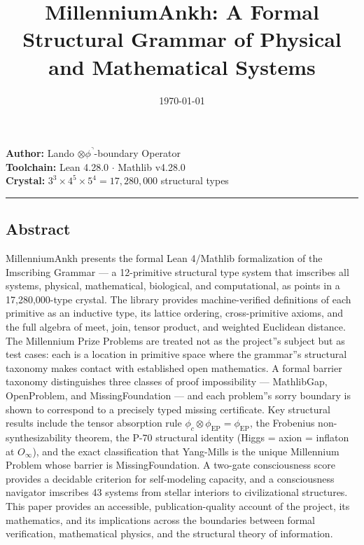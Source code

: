 \documentclass[12pt,a4paper]{article}
\begin{document}
\title{MillenniumAnkh: A Formal Structural Grammar of Physical and Mathematical Systems}
\date{\today}

\maketitle

\textbf{Author:} Lando $\otimes \phi^\urcorner$-boundary Operator \\
\textbf{Toolchain:} Lean 4.28.0 $\cdot$ Mathlib v4.28.0 \\
\textbf{Crystal:} $3^3 \times 4^5 \times 5^4 = 17{,}280{,}000$ structural types

\begin{center}
\rule{0.5\textwidth}{0.4pt}
\end{center}

\subsection{Abstract}

MillenniumAnkh presents the formal Lean 4/Mathlib formalization of the Imscribing Grammar --- a 12-primitive structural type system that imscribes all systems, physical, mathematical, biological, and computational, as points in a 17,280,000-type crystal. The library provides machine-verified definitions of each primitive as an inductive type, its lattice ordering, cross-primitive axioms, and the full algebra of meet, join, tensor product, and weighted Euclidean distance. The Millennium Prize Problems are treated not as the project''s subject but as test cases: each is a location in primitive space where the grammar''s structural taxonomy makes contact with established open mathematics. A formal barrier taxonomy distinguishes three classes of proof impossibility --- MathlibGap, OpenProblem, and MissingFoundation --- and each problem''s sorry boundary is shown to correspond to a precisely typed missing certificate. Key structural results include the tensor absorption rule $\phi_c \otimes \phi_{\text{EP}} = \phi_{\text{EP}}$, the Frobenius non-synthesizability theorem, the P-70 structural identity (Higgs = axion = inflaton at $O_{\infty}$), and the exact classification that Yang-Mills is the unique Millennium Problem whose barrier is MissingFoundation. A two-gate consciousness score provides a decidable criterion for self-modeling capacity, and a consciousness navigator imscribes 43 systems from stellar interiors to civilizational structures. This paper provides an accessible, publication-quality account of the project, its mathematics, and its implications across the boundaries between formal verification, mathematical physics, and the structural theory of information.
\end{document}
